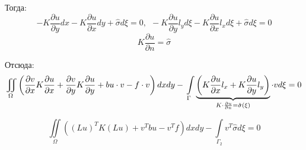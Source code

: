 	Тогда:
	\[-K \frac{\partial u}{\partial y} dx -K \frac{\partial u}{\partial x} dy + \hat \sigma d\xi = 0,\ \ -K \frac{\partial u}{\partial y} l_y d\xi -K \frac{\partial u}{\partial x} l_x d\xi + \hat \sigma d\xi = 0\]
	\[K \frac{\partial u}{\partial n} = \hat \sigma\]
	
	Отсюда:
	\begin{equation}\label{2d_eq_2}
	\iint \limits_{\Omega} \left(\frac{\partial v}{\partial x} K \frac{\partial u}{\partial x} + \frac{\partial v}{\partial y} K \frac{\partial u}{\partial y} + bu \cdot v - f \cdot v\right) dx dy - \\
	\int \limits_{\Gamma} \underbrace{ \left(K \frac{\partial u}{\partial x} l_x + K \frac{\partial u}{\partial y} l_y\right)}_{K \cdot \frac{\partial u}{\partial n} = \hat \sigma(\xi)}  \cdot v d\xi = 0 
	\end{equation}
	
	\[\iint \limits_{\Omega} ((Lu)^T K (Lu) + v^T bu - v^T f) dxdy - \int \limits_{\Gamma_2} v^T \hat \sigma d\xi = 0\]